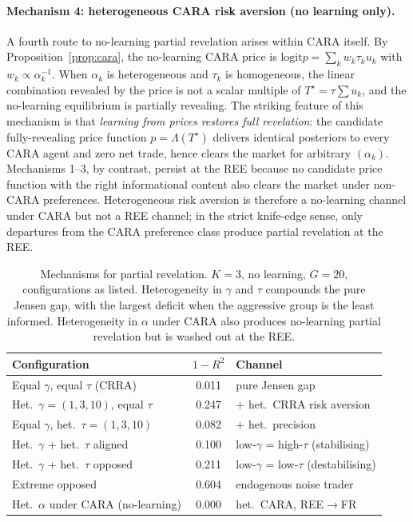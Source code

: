 \documentclass[12pt,letterpaper]{article}
\theoremstyle{definition}
\theoremstyle{remark}
\newcommand{\Lam}{\Lambda}            %
\newcommand{\logit}{\mathrm{logit}}
\newcommand{\Tstar}{T^{\!\star}}
\newcommand{\1}{\mathbf{1}}
\begin{document}
\paragraph{Mechanism 4: heterogeneous CARA risk aversion (no learning only).}
A fourth route to no-learning partial revelation arises within CARA itself.
By Proposition~\ref{prop:cara}, the no-learning CARA price is
$\logit p=\sum_{k}w_{k}\tau_{k}u_{k}$ with $w_{k}\propto\alpha_{k}^{-1}$.
When $\alpha_{k}$ is heterogeneous and $\tau_{k}$ is homogeneous, the
linear combination revealed by the price is not a scalar multiple of
$\Tstar=\tau\sum u_{k}$, and the no-learning equilibrium is partially
revealing. The striking feature of this mechanism is that
\emph{learning from prices restores full revelation}: the candidate
fully-revealing price function $p=\Lam(\Tstar)$ delivers identical
posteriors to every CARA agent and zero net trade, hence clears the market
for arbitrary $(\alpha_{k})$. Mechanisms 1--3, by contrast, persist at the
REE because no candidate price function with the right informational
content also clears the market under non-CARA preferences.
Heterogeneous risk aversion is therefore a no-learning channel under CARA
but not a REE channel; in the strict knife-edge sense, only departures
from the CARA preference class produce partial revelation at the REE.

\begin{table}[htbp]
   \centering
   \caption{Mechanisms for partial revelation. $K=3$, no learning,
   $G=20$, configurations as listed. Heterogeneity in $\gamma$ and $\tau$
   compounds the pure Jensen gap, with the largest deficit when the
   aggressive group is the least informed. Heterogeneity in $\alpha$
   under CARA also produces no-learning partial revelation but is
   washed out at the REE.}
   \label{tab:mechanisms}
   \begin{tabular}{lcl}
      \toprule
      Configuration & $1-R^{2}$ & Channel \\
      \midrule
      Equal $\gamma$, equal $\tau$ (CRRA)        & 0.011 & pure Jensen gap \\
      Het.\ $\gamma=(1,3,10)$, equal $\tau$      & 0.247 & + het.\ CRRA risk aversion \\
      Equal $\gamma$, het.\ $\tau=(1,3,10)$      & 0.082 & + het.\ precision \\
      Het.\ $\gamma$ + het.\ $\tau$ aligned      & 0.100 & low-$\gamma$ = high-$\tau$ (stabilising) \\
      Het.\ $\gamma$ + het.\ $\tau$ opposed      & 0.211 & low-$\gamma$ = low-$\tau$ (destabilising) \\
      Extreme opposed                            & 0.604 & endogenous noise trader \\
      Het.\ $\alpha$ under CARA (no-learning)    & 0.000 & het.\ CARA, REE$\to$FR \\
      \bottomrule
   \end{tabular}
\end{table}
\end{document}
